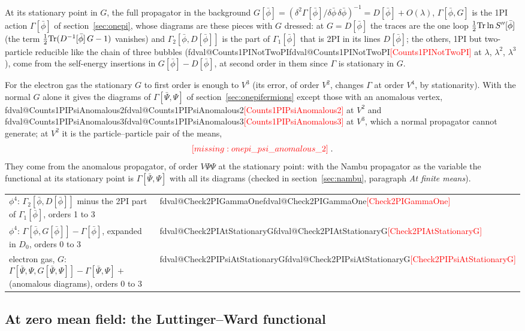 \documentclass[11pt,a4paper]{article}
\makeatletter
\newcommand{\inputfigure}[1]{\IfFileExists{figures/#1.tex}{}{\textcolor{red}{[missing: \detokenize{#1}]}}}
\newcommand{\val}[1]{\ifcsname fdval@#1\endcsname\csname fdval@#1\endcsname\else\textcolor{red}{[#1]}\fi}
\makeatother
\begin{document}
At its stationary point in $G$, the full propagator in the background $G[\bar\phi]=(\delta^2\Gamma[\bar\phi]/\delta\bar\phi\,\delta\bar\phi)^{-1}
=D[\bar\phi]+O(\lambda)$, $\Gamma[\bar\phi,G]$ is the 1PI action $\Gamma[\bar\phi]$ of section~\ref{sec:onepi}, whose diagrams are these
pieces with $G$ dressed: at $G=D[\bar\phi]$ the traces are the one loop $\frac12{\rm Tr}\ln S''[\bar\phi]$ (the term
$\frac12{\rm Tr}(D^{-1}[\bar\phi]\,G-1)$ vanishes) and $\Gamma_2[\bar\phi,D[\bar\phi]]$ is the part of $\Gamma_1[\bar\phi]$ that is 2PI in its
lines $D[\bar\phi]$; the others, 1PI but two-particle reducible like the chain of three bubbles (\val{Counts1PINotTwoPI} at $\lambda$,
$\lambda^2$, $\lambda^3$), come from the self-energy insertions in $G[\bar\phi]-D[\bar\phi]$, at second order in them since $\Gamma$ is
stationary in $G$.

For the electron gas the stationary $G$ to first order is enough to $V^3$ (its error, of order $V^2$, changes $\Gamma$ at order
$V^4$, by stationarity). With the normal $G$ alone it gives the diagrams of $\Gamma[\bar\Psi,\Psi]$ of
section~\ref{sec:onepifermions} except those with an anomalous vertex, \val{Counts1PIPsiAnomalous2} at $V^2$ and
\val{Counts1PIPsiAnomalous3} at $V^3$, which a normal propagator cannot generate; at $V^2$ it is the particle--particle pair
of the means,
\[
\inputfigure{onepi_psi_anomalous_2}\;.
\]
They come from the anomalous propagator, of order $V\Psi\Psi$ at the stationary point: with the Nambu propagator as the
variable the functional at its stationary point is $\Gamma[\bar\Psi,\Psi]$ with all its diagrams (checked in
section~\ref{sec:nambu}, paragraph \emph{At finite means}).
\begin{result}
\begin{tabular}{@{}l@{\quad}l@{}}
$\phi^4$: $\Gamma_2[\bar\phi,D[\bar\phi]]$ minus the 2PI part of $\Gamma_1[\bar\phi]$, orders 1 to 3 & \val{Check2PIGammaOne}\\
$\phi^4$: $\Gamma[\bar\phi,G[\bar\phi]]-\Gamma[\bar\phi]$, expanded in $D_0$, orders 0 to 3 & \val{Check2PIAtStationaryG}\\
electron gas, $G$: $\Gamma[\bar\Psi,\Psi,G[\bar\Psi,\Psi]]-\Gamma[\bar\Psi,\Psi]+{}$(anomalous diagrams), orders 0 to 3 & \val{Check2PIPsiAtStationaryG}
\end{tabular}
\end{result}

\subsection{At zero mean field: the Luttinger--Ward functional}\label{sec:lw}
\end{document}

